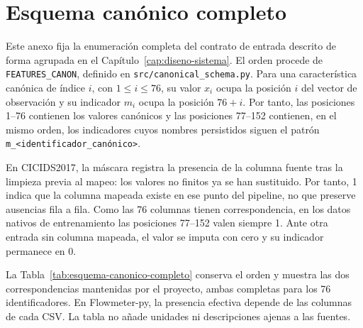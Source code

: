 \chapter{Esquema canónico completo}
\label{cap:anexo-esquema-canonico}

Este anexo fija la enumeración completa del contrato de entrada descrito de forma agrupada en el Capítulo~\ref{cap:diseno-sistema}. El orden procede de \texttt{FEATURES\_CANON}, definido en \texttt{src/canonical\_schema.py}. Para una característica canónica de índice $i$, con $1 \leq i \leq 76$, su valor $x_i$ ocupa la posición $i$ del vector de observación y su indicador $m_i$ ocupa la posición $76+i$. Por tanto, las posiciones 1--76 contienen los valores canónicos y las posiciones 77--152 contienen, en el mismo orden, los indicadores cuyos nombres persistidos siguen el patrón \texttt{m\_<identificador\_canónico>}.

En CICIDS2017, la máscara registra la presencia de la columna fuente tras la limpieza previa al mapeo: los valores no finitos ya se han sustituido. Por tanto, 1 indica que la columna mapeada existe en ese punto del pipeline, no que preserve ausencias fila a fila. Como las 76 columnas tienen correspondencia, en los datos nativos de entrenamiento las posiciones 77--152 valen siempre 1. Ante otra entrada sin columna mapeada, el valor se imputa con cero y su indicador permanece en 0.

La Tabla~\ref{tab:esquema-canonico-completo} conserva el orden y muestra las dos correspondencias mantenidas por el proyecto, ambas completas para los 76 identificadores. En Flowmeter-py, la presencia efectiva depende de las columnas de cada CSV. La tabla no añade unidades ni descripciones ajenas a las fuentes.

